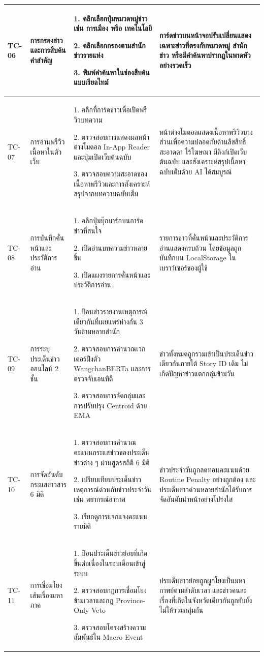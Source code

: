 \begin{longtable}{|C{1.1cm}|L{2.7cm}|L{4.5cm}|L{4.5cm}|}
TC-06 & การกรองข่าวและการสืบค้นคำสำคัญ & 1. คลิกเลือกปุ่มหมวดหมู่ข่าว เช่น การเมือง หรือ เทคโนโลยี\par  2. คลิกเลือกกรองตามสำนักข่าวรายแห่ง\par  3. พิมพ์คำค้นหาในช่องสืบค้นแบบเรียลไทม์ & การ์ดข่าวบนหน้าจอปรับเปลี่ยนแสดงเฉพาะข่าวที่ตรงกับหมวดหมู่ สำนักข่าว หรือมีคำค้นหาปรากฏในพาดหัวอย่างรวดเร็ว \\ \hline
TC-07 & การอ่านพรีวิวเนื้อหาในตัวเว็บ & 1. คลิกที่การ์ดข่าวเพื่อเปิดพรีวิวบทความ\par  2. ตรวจสอบการแสดงผลหน้าต่างโมดอล In-App Reader และปุ่มเปิดเว็บต้นฉบับ\par  3. ตรวจสอบความสะอาดของเนื้อหาพรีวิวและการสังเคราะห์สรุปจากบทความฉบับเต็ม & หน้าต่างโมดอลแสดงเนื้อหาพรีวิวบางส่วนเพื่อความปลอดภัยด้านลิขสิทธิ์ สะอาดตา ไร้โฆษณา มีลิงก์เปิดเว็บต้นฉบับ และสังเคราะห์สรุปเนื้อหาฉบับเต็มด้วย AI ได้สมบูรณ์ \\ \hline
TC-08 & การบันทึกคั่นหน้าและประวัติการอ่าน & 1. คลิกปุ่มบุ๊กมาร์กบนการ์ดข่าวที่สนใจ\par  2. เปิดอ่านบทความข่าวหลายชิ้น\par  3. เปิดแผงรายการคั่นหน้าและประวัติการอ่าน & รายการข่าวที่คั่นหน้าและประวัติการอ่านแสดงครบถ้วน โดยข้อมูลถูกบันทึกบน LocalStorage ในเบราว์เซอร์ของผู้ใช้ \\ \hline
TC-09 & การระบุประเด็นข่าวออนไลน์ 2 ชั้น & 1. ป้อนข่าวรายงานเหตุการณ์เดียวกันที่เผยแพร่ห่างกัน 3 วันข้ามหลายสำนัก\par  2. ตรวจสอบการคำนวณเวกเตอร์ฝังตัว WangchanBERTa และการตรวจจับเอนทิตี\par  3. ตรวจสอบการจัดกลุ่มและการปรับปรุง Centroid ด้วย EMA & ข่าวทั้งหมดถูกรวมเข้าเป็นประเด็นข่าวเดียวกันภายใต้ Story ID เดิม ไม่เกิดปัญหาข่าวแตกกลุ่มข้ามวัน \\ \hline
TC-10 & การจัดอันดับกระแสข่าวสาร 6 มิติ & 1. ตรวจสอบการคำนวณคะแนนกระแสข่าวของประเด็นข่าวต่าง ๆ ผ่านสูตรสถิติ 6 มิติ\par  2. เปรียบเทียบประเด็นข่าวเหตุการณ์ด่วนกับข่าวประจำวัน เช่น พยากรณ์อากาศ\par  3. เรียกดูการแจกแจงคะแนนรายมิติ & ข่าวประจำวันถูกลดทอนคะแนนด้วย Routine Penalty อย่างถูกต้อง และประเด็นข่าวด่วนหลายสำนักได้รับการจัดอันดับนำหน้าอย่างโปร่งใส \\ \hline
TC-11 & การเชื่อมโยงเส้นเรื่องมหาภาค & 1. ป้อนประเด็นข่าวย่อยที่เกิดขึ้นต่อเนื่องในรอบเดือนเข้าสู่ระบบ\par  2. ตรวจสอบกฎการเชื่อมโยงข้ามเวลาและกฎ Province-Only Veto\par  3. ตรวจสอบโครงสร้างความสัมพันธ์ใน Macro Event & ประเด็นข่าวย่อยถูกผูกโยงเป็นมหากาพย์ตามลำดับเวลา และข่าวคนละเรื่องที่เกิดในจังหวัดเดียวกันถูกยับยั้งไม่ให้รวมกลุ่มกัน \\ \hline

\end{longtable}
